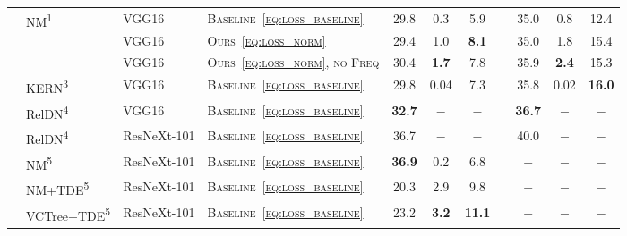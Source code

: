 \begin{table}
\begin{center}
\begin{tabular}{llllccccccc}
			& \multirow{3}{*}{NM\textsuperscript{1}} & VGG16 & \textsc{Baseline~\eqref{eq:loss_baseline}} & 29.8 & \cellcolor{extreme}0.3 & \cellcolor{bad}5.9 & & 35.0 & \cellcolor{extreme}0.8 & \cellcolor{bad}12.4\Tstrut \\
			& & VGG16 & \textsc{Ours~\eqref{eq:loss_norm}} & 29.4 & \cellcolor{extreme}1.0 & \cellcolor{bad}\textbf{8.1} & & 35.0 & \cellcolor{extreme}1.8 & \cellcolor{bad}15.4 \\
			& & VGG16 & \textsc{Ours~\eqref{eq:loss_norm}, no Freq} & {30.4} & \cellcolor{extreme}\textbf{1.7} & \cellcolor{bad}7.8 & & {35.9} & \cellcolor{extreme}\textbf{2.4} & \cellcolor{bad}15.3\Bstrut \\
			& KERN\textsuperscript{3} & VGG16 & \textsc{Baseline~\eqref{eq:loss_baseline}} & 29.8 & 0.04 & 7.3 & & 35.8 & 0.02 & \textbf{16.0}\Tstrut\\
			& RelDN\textsuperscript{4} & VGG16 & \textsc{Baseline~\eqref{eq:loss_baseline}} & \textbf{32.7} & $-$ & $-$ & & \textbf{ 36.7} & $-$ & $-$\Bstrut \\
			\cline{2-11}
			& RelDN\textsuperscript{4} & ResNeXt-101 & \textsc{Baseline~\eqref{eq:loss_baseline}} & 36.7 & $-$ & $-$ & & 40.0 & $-$ & $-$\Tstrut \\
			& NM\textsuperscript{5} & ResNeXt-101 & \textsc{Baseline~\eqref{eq:loss_baseline}} & \textbf{36.9} & 0.2 & 6.8 & & $-$ & $-$ & $-$ \\
			& NM+TDE\textsuperscript{5} & ResNeXt-101 & \textsc{Baseline~\eqref{eq:loss_baseline}} & 20.3 & 2.9 & 9.8 & & $-$ & $-$ & $-$  \\
			& VCTree+TDE\textsuperscript{5} & ResNeXt-101 & \textsc{Baseline~\eqref{eq:loss_baseline}} & 23.2 & \textbf{3.2} & \textbf{11.1} & & $-$ & $-$ & $-$\Bstrut \\
			\bottomrule
		\end{tabular}
	\end{center}
	\vspace{-15pt}
	
\end{table}

\vspace{-6pt}
